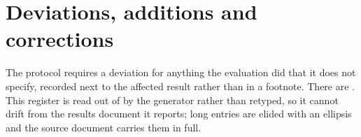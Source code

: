 \section{Deviations, additions and corrections}
\label{app:deviations}

The protocol requires a deviation for anything the evaluation did that it does not specify, recorded
next to the affected result rather than in a footnote. There are \vsevenDeviations{}. This register is
read out of  by the generator rather than retyped, so it cannot
drift from the results document it reports; long entries are elided with an ellipsis and the source
document carries them in full.

{\small}
